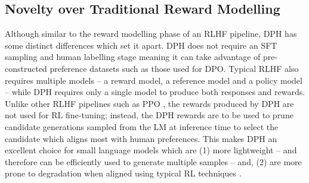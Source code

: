 \subsection{Novelty over Traditional Reward Modelling}
Although similar to the reward modelling phase of an RLHF pipeline, DPH has some distinct differences which set it apart. DPH does not require an SFT sampling and human labelling stage meaning it can take advantage of pre-constructed preference datasets such as those used for DPO. Typical RLHF also requires multiple models -- a reward model, a reference model and a policy model -- while DPH requires only a single model to produce both responses and rewards. Unlike other RLHF pipelines such as PPO \cite{schulman2017proximal}, the rewards produced by DPH are not used for RL fine-tuning; instead, the DPH rewards are to be used to prune candidate generations sampled from the LM at inference time to select the candidate which aligns most with human preferences. This makes DPH an excellent choice for small language models which are (1) more lightweight -- and therefore can be efficiently used to generate multiple samples -- and, (2) are more prone to degradation when aligned using typical RL techniques \cite{bekbayev2023poison, bai2022training}.